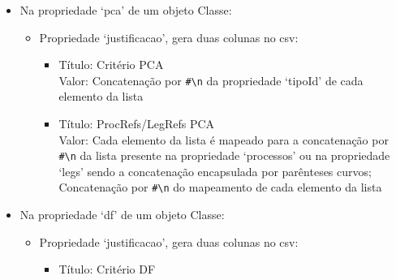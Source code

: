 \begin{itemize}
\begin{itemize}
        \begin{itemize}
            \item Propriedade `entidades':
            \begin{itemize}
                \item Título: Entidades \\
                      Valor: Concatenação por \verb|#\n| da propriedade `sigla' de cada elemento da lista
            \end{itemize}
            \item Propriedade `regula':
            \begin{itemize}
                \item Título: Regula processo \\
                      Valor: Concatenação por \verb|#\n| da propriedade `codigo' de cada elemento da lista
            \end{itemize}
        \end{itemize}
        \item Na propriedade `pca' de um objeto Classe:
        \begin{itemize}
            \item Propriedade `justificacao', gera duas colunas no \acrshort{csv}:
            \begin{itemize}
                \item Título: Critério PCA \\
                      Valor: Concatenação por \verb|#\n| da propriedade `tipoId' de cada elemento da lista
                \item Título: ProcRefs/LegRefs PCA \\
                      Valor: Cada elemento da lista é mapeado para a concatenação por \verb|#\n| da lista presente na propriedade `processos' ou na propriedade `legs' sendo a concatenação encapsulada por parênteses curvos; Concatenação por \verb|#\n| do mapeamento de cada elemento da lista               
            \end{itemize}
        \end{itemize}
        \item Na propriedade `df' de um objeto Classe:
        \begin{itemize}
            \item Propriedade `justificacao', gera duas colunas no \acrshort{csv}:
            \begin{itemize}
                \item Título: Critério DF \\

\end{itemize}
\end{itemize}
\end{itemize}
\end{itemize}
